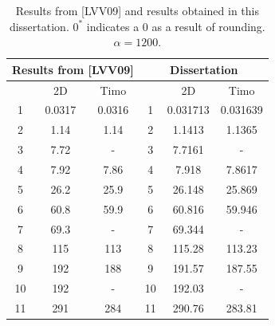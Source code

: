 	\begin{table}[!ht]
		\centering
		\caption{Results from [LVV09] and results obtained in this dissertation. $0^*$ indicates a 0 as a result of rounding. $\alpha = 1200$.}
		\begin{tabular}{|c|c|c||c|c|c|}
			\hline
			\multicolumn{3}{|c||}{Results from [LVV09]} & \multicolumn{3}{c|}{Dissertation} \\ \hline \hline
			~ & 2D & Timo & ~ & 2D & Timo  \\ \hline
			1 & 0.0317 & 0.0316 & 1 & 0.031713 & 0.031639  \\ 
			2 & 1.14 & 1.14  & 2 & 1.1413 & 1.1365  \\ 
			3 & 7.72 & - & 3 & 7.7161 & - \\ 
			4 & 7.92 & 7.86 &  4 & 7.918 & 7.8617    \\ 
			5 & 26.2 & 25.9 & 5 & 26.148 & 25.869   \\ 
			6 & 60.8 & 59.9 & 6 & 60.816 & 59.946  \\ 
			7 & 69.3 & - & 7 & 69.344 & -  \\ 
			8 & 115 & 113 &  8 & 115.28 & 113.23   \\ 
			9 & 192 & 188 &  9 & 191.57 & 187.55   \\ 
			10 & 192 & - & 10 & 192.03 & -  \\ 
			11 & 291 & 284 & 11 & 290.76 & 283.81   \\ \hline
		\end{tabular}\label{Results_LVV09}
	\end{table}


